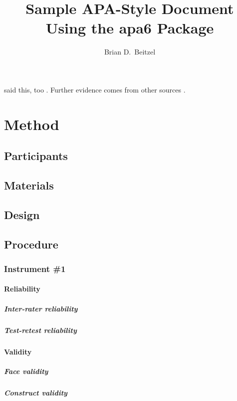 \documentclass[man]{apa6}
\title{Sample APA-Style Document Using the \textsf{apa6} Package}
\author{Brian D.\ Beitzel}
\affiliation{SUNY Oneonta}
\begin{document}
\maketitle
\lipsum[2]

\Textcite{vonDavier2011} said this,
too \parencite{vonDavier2011,Lassen2006}.  Further evidence comes from
other sources \parencite{Shotton1989,Lassen2006}.  \lipsum[3]

\section{Method}
\subsection{Participants}
\lipsum[4]

\subsection{Materials}
\lipsum[5]

\subsection{Design}
\lipsum[6]

\subsection{Procedure}
\lipsum[7]

\subsubsection{Instrument \#1}
\lipsum[8]

\paragraph{Reliability}
\lipsum[9]

\subparagraph{Inter-rater reliability}
\lipsum[10]

\subparagraph{Test-retest reliability}
\lipsum[11]

\paragraph{Validity}
\lipsum[12]

\subparagraph{Face validity}
\lipsum[13]

\subparagraph{Construct validity}
\lipsum[14]
\end{document}
